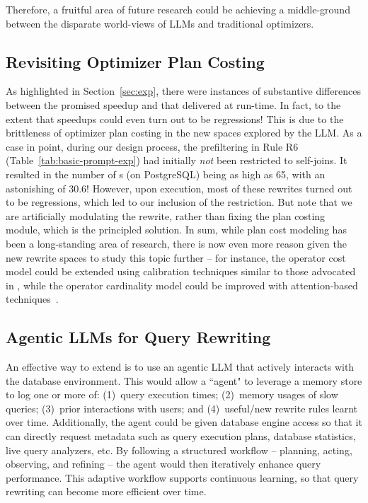 Therefore, a fruitful area of future research could be achieving a middle-ground between the disparate world-views of LLMs and traditional optimizers.
%

\subsection{Revisiting Optimizer Plan Costing}
\label{sec:cost-mismatch}

As highlighted in Section~\ref{sec:exp}, there were instances of substantive differences between the promised speedup and that delivered at run-time. In fact, to the extent that speedups could even turn out to be regressions! This is due to the brittleness of optimizer plan costing in the new spaces explored by the LLM. As a case in point, during our \lithe design process, the prefiltering in Rule R6 (Table~\ref{tab:basic-prompt-exp}) had initially \emph{not} been restricted to self-joins. It resulted in the number of {\cpr}s (on PostgreSQL) being as high as 65, with an astonishing \csgm of 30.6! However, upon execution, most of these rewrites turned out to be regressions, which led to our inclusion of the restriction. But note that we are artificially modulating the rewrite, rather than fixing the plan costing module, which is the principled solution.  In sum, while plan cost modeling has been a long-standing area of research, there is now even more reason given the new rewrite spaces to study this topic further -- for instance, the operator cost model could be extended using calibration techniques similar to those advocated in \cite{wucostmodel}, while the operator cardinality model could be improved with attention-based techniques~\cite{alece}.

\subsection{Agentic LLMs for Query Rewriting}

An effective way to extend \lithe is to use an agentic LLM that actively interacts with the database environment. 
This would allow a ``\lithe agent" to leverage a memory store to log one or more of: (1)~query execution times; (2)~memory usages of slow queries; (3)~prior interactions with users; and (4)~useful/new rewrite rules  learnt over time. Additionally, the agent could be given database engine access so that it can directly request metadata such as query execution plans, database statistics, live query analyzers, etc. 
%
By following a structured workflow -- planning, acting, observing, and refining -- the agent would then iteratively enhance query performance. This adaptive workflow supports continuous learning, so that query rewriting can become more efficient over time.


